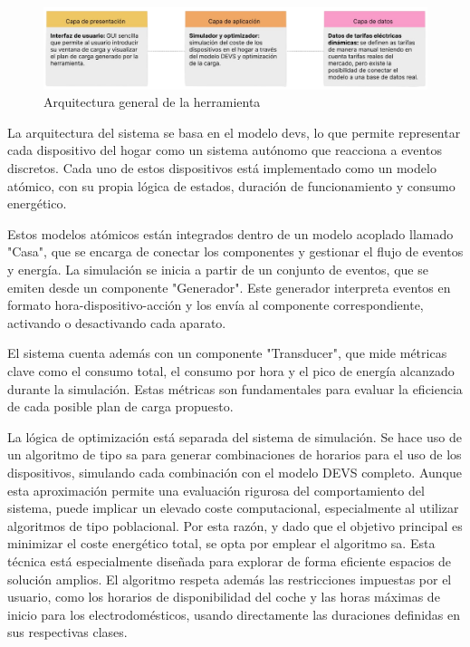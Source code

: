 \documentclass[11pt,a4paper]{book}
\begin{document}
\begin{figure}
    \centering
    \includegraphics[width=1\linewidth]{fig/Screenshot_2025-04-17_at_20.38.32-removebg-preview.png}
    \caption{Arquitectura general de la herramienta}
    \label{fig:arquitectura-general}
\end{figure}
La arquitectura del sistema se basa en el modelo \gls{devs}, lo que permite representar cada dispositivo del hogar como un sistema autónomo que reacciona a eventos discretos. Cada uno de estos dispositivos está implementado como un modelo atómico, con su propia lógica de estados, duración de funcionamiento y consumo energético.

Estos modelos atómicos están integrados dentro de un modelo acoplado llamado "Casa", que se encarga de conectar los componentes y gestionar el flujo de eventos y energía. La simulación se inicia a partir de un conjunto de eventos, que se emiten desde un componente "Generador". Este generador interpreta eventos en formato hora-dispositivo-acción y los envía al componente correspondiente, activando o desactivando cada aparato.

El sistema cuenta además con un componente "Transducer", que mide métricas clave como el consumo total, el consumo por hora y el pico de energía alcanzado durante la simulación. Estas métricas son fundamentales para evaluar la eficiencia de cada posible plan de carga propuesto.

La lógica de optimización está separada del sistema de simulación. Se hace uso de un algoritmo de tipo \gls{sa} para generar combinaciones de horarios para el uso de los dispositivos, simulando cada combinación con el modelo DEVS completo. Aunque esta aproximación permite una evaluación rigurosa del comportamiento del sistema, puede implicar un elevado coste computacional, especialmente al utilizar algoritmos de tipo poblacional. Por esta razón, y dado que el objetivo principal es minimizar el coste energético total, se opta por emplear el algoritmo \gls{sa}. Esta técnica está especialmente diseñada para explorar de forma eficiente espacios de solución amplios. El algoritmo respeta además las restricciones impuestas por el usuario, como los horarios de disponibilidad del coche y las horas máximas de inicio para los electrodomésticos, usando directamente las duraciones definidas en sus respectivas clases.
\end{document}
